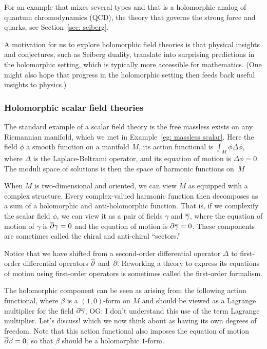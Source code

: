 \documentclass[11pt]{amsart}
\def\del{\partial}
\def\owen#1{{\textcolor{violet!50!black}{OG: {#1}}}}
\begin{document}
For an example that mixes several types and that is a holomorphic analog of quantum chromodynamics (QCD), the theory that governs the strong force and quarks,
see Section~\ref{sec: seiberg}.

A motivation for us to explore holomorphic field theories is that physical insights and conjectures, such as Seiberg duality, translate into surprising predictions in the holomorphic setting,
which is typically more accessible for mathematics.
(One might also hope that progress in the holomorphic setting then feeds back useful insights to physics.)

\subsubsection{Holomorphic scalar field theories}

The standard example of a scalar field theory is the free massless exists on any Riemannian manifold,
which we met in Example~\ref{eg: massless scalar}.
Here the field $\phi$ a smooth function on a manifold $M$,
its action functional is $\int_M \phi \Delta \phi$, where $\Delta$ is the Laplace-Beltrami operator, 
and its equation of motion is $\Delta \phi = 0$.
The moduli space of solutions is then the space of harmonic functions on~$M$

When $M$ is two-dimensional and oriented,
we can view $M$ as equipped with a complex structure.
Every complex-valued harmonic function then decomposes as a sum of a holomorphic and anti-holomorphic function. 
That is, if we complexify the scalar field $\phi$, 
we can view it as a pair of fields $\gamma$ and $\Bar{\gamma}$,
where the equation of motion of $\gamma$ is $\dbar \gamma = 0$ and the equation of motion is $\partial \Bar{\gamma} = 0$.
These components are sometimes called the chiral and anti-chiral ``sectors.'' 

Notice that we have shifted from a second-order differential operator $\Delta$ to first-order differential operators $\dbar$ and~$\partial$.
Reworking a theory to express its equations of motion using first-order operators is sometimes called the first-order formalism.

The holomorphic component can be seen as arising from the following action functional,
\beqn
\int \beta \wedge \dbar \gamma
\eeqn
where $\beta$ is a $(1,0)$-form on $M$ and should be viewed as a Lagrange multiplier for the field $\del \Bar{\gamma}$,
\owen{I don't understand this use of the term Lagrange multiplier. Let's discuss!}
which we now think about as having its own degrees of freedom. 
Note that this action functional also imposes the equation of motion $\dbar \beta = 0$,
so that $\beta$ should be a holomorphic $1$-form.
\end{document}
